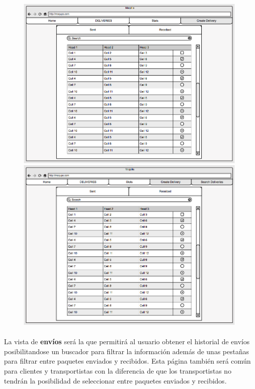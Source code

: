 \documentclass[10pt, a4paper,spanish]{article}
\begin{document}
			\begin{figure}[H]
				\centering
				\begin{minipage}[b]{0.49\textwidth}
					\includegraphics[width=\textwidth]{res/sketch_deliveries.png}

				\end{minipage}
				\begin{minipage}[b]{0.49\textwidth}
					\includegraphics[width=\textwidth]{res/sketch_deliveries_carrier.png}

				\end{minipage}
			\end{figure}

			\paragraph{}
			La vista de \textbf{envíos} será la que permitirá al usuario obtener el historial de envíos posibilitandose un buscador para filtrar la información además de unas pestañas para filtrar entre paquetes enviados y recibidos. Esta página también será común para clientes y transportistas con la diferencia de que los transportistas no tendrán la posibilidad de seleccionar entre paquetes enviados y recibidos.
\end{document}
